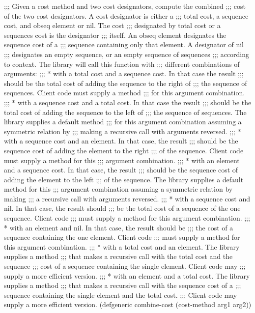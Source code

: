 ;;; Given a cost method and two cost designators, compute the combined
;;; cost of the two cost designators.  A cost designator is either a
;;; total cost, a sequence cost, and obseq element or nil.  The cost
;;; designated by total cost or a sequences cost is the designator
;;; itself.  An obseq element designates the sequence cost of a
;;; sequence containing only that element. A designator of nil
;;; designates an empty sequence, or an empty sequence of sequences
;;; according to context.  The library will call this function with
;;; different combinations of arguments:
;;; *  with a total cost and a sequence cost.  In that case the result
;;;    should be the total cost of adding the sequence to the right of
;;;    the sequence of sequences.  Client code must supply a method
;;;    for this argument combination. 
;;; *  with a sequence cost and a total cost.  In that case the result
;;;    should be the total cost of adding the sequence to the left of
;;;    the sequence of sequences.  The library supplies a default method
;;;    for this argument combination assuming a symmetric relation by 
;;;    making a recursive call with arguments reversed. 
;;; *  with a sequence cost and an element.  In that case, the result
;;;    should be the sequence cost of adding the element to the right
;;;    of the sequence.  Client code must supply a method for this
;;;    argument combination.
;;; *  with an element and a sequence cost.  In that case, the result
;;;    should be the sequence cost of adding the element to the left
;;;    of the sequence. The library supplies a default method for this
;;;    argument combination assuming a symmetric relation by making
;;;    a recursive call with arguments reversed. 
;;; *  with a sequence cost and nil.  In that case, the result should
;;;    be the total cost of a sequence of the one sequence.  Client code 
;;;    must supply a method for this argument combination. 
;;; *  with an element and nil.  In that case, the result should be
;;;    the cost of a sequence containing the one element.  Client code
;;;    must supply a method for this argument combination.
;;; *  with a total cost and an element.  The library supplies a method
;;;    that makes a recursive call with the total cost and the sequence 
;;;    cost of a sequence containing the single element.  Client code may 
;;;    supply a more efficient version.
;;; *  with an element and a total cost.  The library supplies a method
;;;    that makes a recursive call with the sequence cost of a
;;;    sequence containing the single element and the total cost.
;;;    Client code may supply a more efficient version.
(defgeneric combine-cost (cost-method arg1 arg2))

